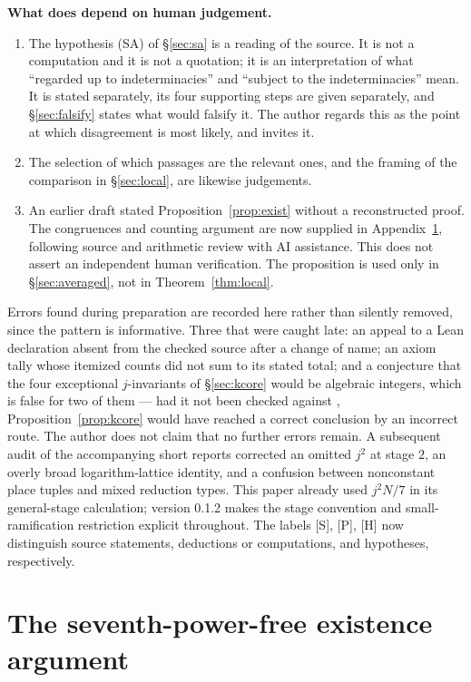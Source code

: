 \documentclass[11pt]{article}
\theoremstyle{plain}
\theoremstyle{definition}
\newcommand{\SA}{\textup{(SA)}}
\begin{document}
\medskip\noindent\textbf{What does depend on human judgement.}
\begin{enumerate}[label=(\roman*),start=4]
\item The hypothesis \SA{} of \S\ref{sec:sa} is a reading of the source.  It is
  not a computation and it is not a quotation; it is an interpretation of what
  ``regarded up to indeterminacies'' and ``subject to the indeterminacies''
  mean.  It is stated separately, its four supporting steps are given
  separately, and \S\ref{sec:falsify} states what would falsify it.  The author
  regards this as the point at which disagreement is most likely, and invites it.
\item The selection of which passages are the relevant ones, and the framing of
  the comparison in \S\ref{sec:local}, are likewise judgements.
\item An earlier draft stated Proposition~\ref{prop:exist} without a
  reconstructed proof.  The congruences and counting argument are now supplied
  in Appendix~\ref{app:family}, following source and arithmetic review with AI
  assistance.  This does not assert an independent human verification.  The
  proposition is used only in \S\ref{sec:averaged}, not in
  Theorem~\ref{thm:local}.
\end{enumerate}

\medskip\noindent
Errors found during preparation are recorded here rather than silently removed,
since the pattern is informative.  Three that were caught late: an appeal to a
Lean declaration absent from the checked source after a change of name; an
axiom tally whose itemized counts did not sum to its stated total; and a conjecture
that the four exceptional $j$-invariants of \S\ref{sec:kcore} would be algebraic
integers, which is false for two of them --- had it not been checked against
\cite[Proposition 2.1]{MFHMP}, Proposition~\ref{prop:kcore} would have reached a
correct conclusion by an incorrect route.  The author does not claim that no
further errors remain.  A subsequent audit of the accompanying short reports
corrected an omitted $j^2$ at stage $2$, an overly broad logarithm-lattice
identity, and a confusion between nonconstant place tuples and mixed reduction
types.  This paper already used $j^2N/7$ in its general-stage calculation;
version 0.1.2 makes the stage convention and small-ramification restriction
explicit throughout.  The labels [S], [P], [H] now distinguish source
statements, deductions or computations, and hypotheses, respectively.

\section{The seventh-power-free existence argument}\label{app:family}
\end{document}
